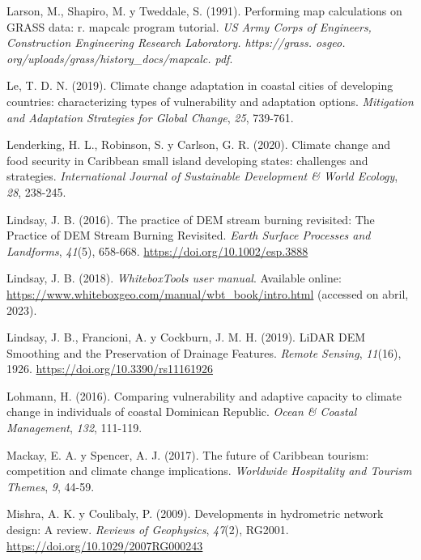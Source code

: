 \documentclass[spanish]{article}
\newlength{\cslhangindent}
\newlength{\cslentryspacingunit} %
\newenvironment{CSLReferences}[2] %
 {%
  \setlength{\parindent}{0pt}
  \ifodd #1
  \let\oldpar\par
  \def\par{\hangindent=\cslhangindent\oldpar}
  \fi
  \setlength{\parskip}{#2\cslentryspacingunit}
 }%
 {}
\begin{document}
\begin{CSLReferences}{1}{0}
\leavevmode{}%
Larson, M., Shapiro, M. y Tweddale, S. (1991). Performing map
calculations on GRASS data: r. mapcalc program tutorial. \emph{US Army
Corps of Engineers, Construction Engineering Research Laboratory.
https://grass. osgeo. org/uploads/grass/history{\_}docs/mapcalc. pdf}.

\leavevmode{}%
Le, T. D. N. (2019). Climate change adaptation in coastal cities of
developing countries: characterizing types of vulnerability and
adaptation options. \emph{Mitigation and Adaptation Strategies for
Global Change}, \emph{25}, 739-761.

\leavevmode{}%
Lenderking, H. L., Robinson, S. y Carlson, G. R. (2020). Climate change
and food security in Caribbean small island developing states:
challenges and strategies. \emph{International Journal of Sustainable
Development \& World Ecology}, \emph{28}, 238-245.

\leavevmode{}%
Lindsay, J. B. (2016). The practice of DEM stream burning revisited: The
Practice of DEM Stream Burning Revisited. \emph{Earth Surface Processes
and Landforms}, \emph{41}(5), 658-668.
\url{https://doi.org/10.1002/esp.3888}

\leavevmode{}%
Lindsay, J. B. (2018). \emph{{WhiteboxTools user manual}}. Available
online: \url{https://www.whiteboxgeo.com/manual/wbt_book/intro.html}
(accessed on abril, 2023).

\leavevmode{}%
Lindsay, J. B., Francioni, A. y Cockburn, J. M. H. (2019). LiDAR DEM
Smoothing and the Preservation of Drainage Features. \emph{Remote
Sensing}, \emph{11}(16), 1926. \url{https://doi.org/10.3390/rs11161926}

\leavevmode{}%
Lohmann, H. (2016). Comparing vulnerability and adaptive capacity to
climate change in individuals of coastal Dominican Republic. \emph{Ocean
\& Coastal Management}, \emph{132}, 111-119.

\leavevmode{}%
Mackay, E. A. y Spencer, A. J. (2017). The future of Caribbean tourism:
competition and climate change implications. \emph{Worldwide Hospitality
and Tourism Themes}, \emph{9}, 44-59.

\leavevmode{}%
Mishra, A. K. y Coulibaly, P. (2009). Developments in hydrometric
network design: A review. \emph{Reviews of Geophysics}, \emph{47}(2),
RG2001. \url{https://doi.org/10.1029/2007RG000243}


\end{CSLReferences}
\end{document}
